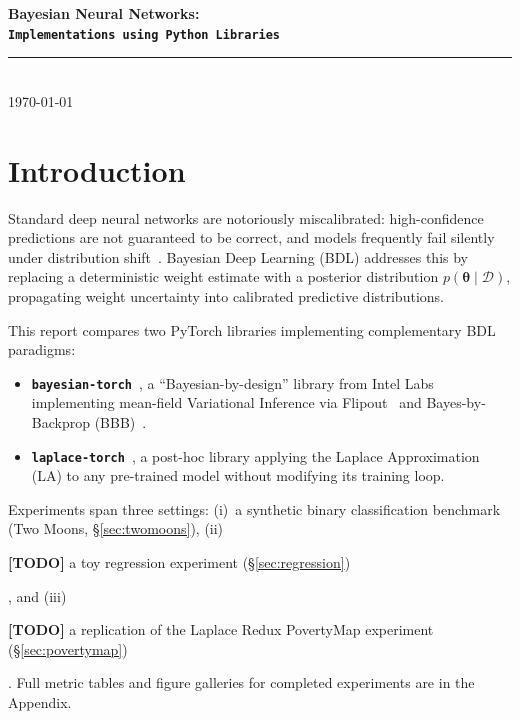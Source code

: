\documentclass[12pt,a4paper]{article}
\newcommand{\btheta}{\bm{\theta}}
\newcommand{\cD}{\mathcal{D}}
\newcommand{\todo}[1]{\noindent\colorbox{yellow!40}{\parbox{\dimexpr\linewidth-2\fboxsep}{\textbf{[TODO]} #1}}}
\begin{document}
\begin{titlepage}
  \centering\vspace*{2cm}
  {\LARGE\bfseries Bayesian Neural Networks:\\[4pt]
   \texttt{Implementations using Python Libraries}\par}
  \vspace{0.8cm}
  \vspace{2cm}
  \rule{0.7\linewidth}{0.4pt}\\[0.4cm]
  {\normalsize\today}
\end{titlepage}

\tableofcontents
\newpage

\section{Introduction}
\label{sec:intro}

Standard deep neural networks are notoriously miscalibrated: high-confidence
predictions are not guaranteed to be correct, and models frequently fail
silently under distribution shift~\citep{goan2020bayesian,murphy2023pml}.
Bayesian Deep Learning (BDL) addresses this by replacing a deterministic weight
estimate with a posterior distribution $p(\btheta \mid \cD)$, propagating weight
uncertainty into calibrated predictive distributions.

This report compares two PyTorch libraries implementing complementary BDL
paradigms:
\begin{itemize}[leftmargin=*]
  \item \textbf{\texttt{bayesian-torch}}~\citep{intel2021bayesiantorch}, a
        ``Bayesian-by-design'' library from Intel Labs implementing mean-field
        Variational Inference via Flipout~\citep{wen2018flipout} and
        Bayes-by-Backprop (BBB)~\citep{blundell2015weight}.
  \item \textbf{\texttt{laplace-torch}}~\citep{daxberger2021laplace,aleximmer2024laplace},
        a post-hoc library applying the Laplace Approximation (LA) to any
        pre-trained model without modifying its training loop.
\end{itemize}

Experiments span three settings: (i)~a synthetic binary classification
benchmark (Two Moons, \S\ref{sec:twomoons}), (ii)~\todo{a toy regression
experiment (\S\ref{sec:regression})}, and (iii)~\todo{a replication of the
Laplace Redux PovertyMap experiment (\S\ref{sec:povertymap})}.
Full metric tables and figure galleries for completed experiments are in the
Appendix.
\end{document}
